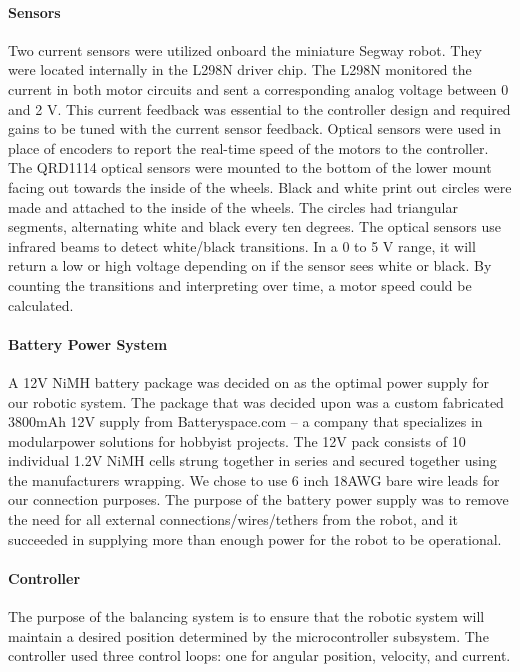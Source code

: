 \documentclass[11pt]{report}
\begin{document}
\begin{spacing}{1.5}
        \paragraph{Sensors}
        
        Two current sensors were utilized onboard the miniature Segway robot. They were located internally in the L298N driver chip. The L298N monitored the current in both motor circuits and sent a corresponding analog voltage between 0 and 2 V. This current feedback was essential to the controller design and required gains to be tuned with the current sensor feedback. Optical sensors were used in place of encoders to report the real-time speed of the motors to the controller. The QRD1114 optical sensors were mounted to the bottom of the lower mount facing out towards the inside of the wheels. Black and white print out circles were made and attached to the inside of the wheels. The circles had triangular segments, alternating white and black every ten degrees. The optical sensors use infrared beams to detect white/black transitions. In a 0 to 5 V range, it will return a low or high voltage depending on if the sensor sees white or black. By counting the transitions and interpreting over time, a motor speed could be calculated.
        
        \paragraph{Battery Power System}
        
        A 12V NiMH battery package was decided on as the optimal power supply for our robotic system. The package that was decided upon was a custom fabricated 3800mAh 12V supply from Batteryspace.com – a company that specializes in modularpower solutions for hobbyist projects. The 12V pack consists of 10 individual 1.2V NiMH cells strung together in series and secured together using the manufacturers wrapping. We chose to use 6 inch 18AWG bare wire leads for our connection purposes. The purpose of the battery power supply was to remove the need for all external connections/wires/tethers from the robot, and it succeeded in supplying more than enough power for the robot to be operational.
        
        \paragraph{Controller}
        
        The purpose of the balancing system is to ensure that the robotic system will maintain a desired position determined by the microcontroller subsystem. The controller used three control loops: one for angular position, velocity, and current. 
        

\end{spacing}
\end{document}
